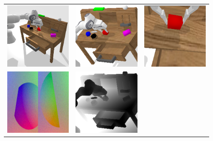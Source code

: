 \documentclass[../main.tex]{subfiles}
\begin{document}
\begin{figure}[t]
	\centering
	\setlength{\tabcolsep}{2pt}
	\begin{tabular}{c c c}
		\includegraphics[width=0.32\linewidth]{figures/calvin/scene.png}        &
		\includegraphics[width=0.32\linewidth]{figures/calvin/rgb_static.png}   &
		\includegraphics[width=0.32\linewidth]{figures/calvin/rgb_gripper.png}    \\
		\includegraphics[width=0.32\linewidth]{figures/calvin/tactile.png}      &
		\includegraphics[width=0.32\linewidth]{figures/calvin/depth_static.png} &

\end{tabular}
\end{figure}
\end{document}
